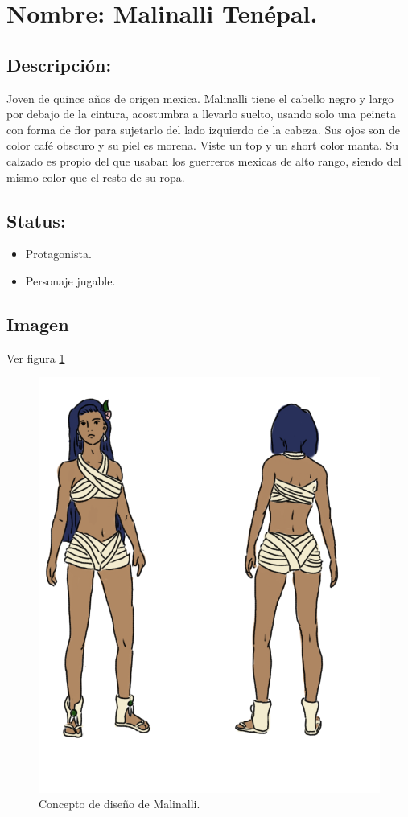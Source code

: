 \section{Nombre: Malinalli Tenépal.} \label{per:malinalli}
	\subsection{Descripción:}
Joven de quince años de origen mexica. Malinalli tiene el cabello negro y largo por debajo de la cintura, acostumbra a llevarlo suelto, usando solo una peineta con forma de flor para sujetarlo del lado izquierdo de la cabeza. Sus ojos son de color café obscuro y su piel es morena. Viste un top y un short color manta. Su calzado es propio del que usaban los guerreros mexicas de alto rango, siendo del mismo color que el resto de su ropa.  
\subsection{Status:}
	\begin{itemize}
		\item Protagonista.
		\item Personaje jugable.
	\end{itemize} 
\subsection{Imagen}
Ver figura \ref{fig:MalinalliDiseno}
\begin{figure}
				\centering
				\includegraphics[height=0.3 \textheight]{Imagenes/malinalli}
				\caption{Concepto de diseño de Malinalli.}
				\label{fig:MalinalliDiseno}
\end{figure}
